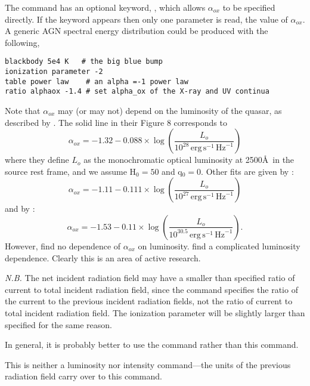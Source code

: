 The  command has an optional keyword,
, which allows $\alpha_{ox}$
to be specified directly.
If the keyword appears then only one parameter
is read, the value of $\alpha_{ox}$.
A generic AGN spectral energy distribution could be produced with
the following,
\begin{verbatim}
blackbody 5e4 K   # the big blue bump
ionization parameter -2
table power law    # an alpha =-1 power law
ratio alphaox -1.4 # set alpha_ox of the X-ray and UV continua
\end{verbatim}
Note that $\alpha_{ox}$ may (or may not) depend on the luminosity of the quasar,
as described by \citet{Avni1986}.
The solid line in their Figure 8 corresponds to
\begin{equation}
\alpha _{ox}  =  - 1.32 - 0.088 \times \log \left( {\frac{{L_o }}{{10^{28}
\,{\mathrm{erg}}\,{\mathrm{s}}^{ - {\mathrm{1}}} \,{\mathrm{Hz}}^{ - {\mathrm{1}}} }}} \right)%
\end{equation}
where they define $L_o$ as the monochromatic optical luminosity
at 2500\AA\  in the source rest frame,
and we assume H$_0 = 50$ and q$_0 = 0$.
Other fits are given
by \citet{Worrall1987}:
\begin{equation}
\alpha _{ox}  =  - 1.11 - 0.111 \times \log \left( {\frac{{L_o }}{{10^{27}
\,{\mathrm{erg}}\,{\mathrm{s}}^{ - {\mathrm{1}}} \,{\mathrm{Hz}}^{ - {\mathrm{1}}} }}} \right)%
\end{equation}
and by \citet{Wilkes1994}:
\begin{equation}
\alpha _{ox}  =  - 1.53 - 0.11 \times \log \left( {\frac{{L_o }}{{10^{30.5}
\,{\mathrm{erg}}\,{\mathrm{s}}^{ - {\mathrm{1}}} \,{\mathrm{Hz}}^{ - {\mathrm{1}}} }}} \right)
.%
\end{equation}
However, \citet{LaFranca1995} find no dependence
of $\alpha_{ox}$ on luminosity.
\citet{Avni1995} find a complicated luminosity dependence.
Clearly this is an area of active research.

\emph{N.B.}  The net incident radiation field may have a
smaller than specified ratio of current
to total incident radiation field,
since the command specifies the ratio of the current
to the previous incident radiation fields,
not the ratio of current to total incident radiation field.
The ionization parameter will be slightly larger than
specified for the same reason.

In general, it is probably better to use the  command
rather than this command.

This is neither a luminosity nor intensity command---the units
of the previous radiation field carry over to this command.

